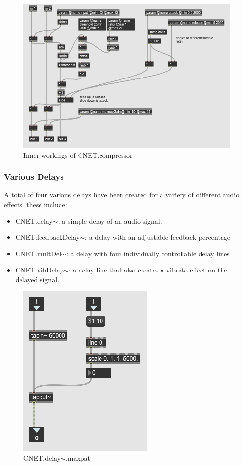 \begin{figure}
    \centering
    \includegraphics{diagrams/maxPatches/compInner.png}
    \caption{Inner workings of CNET.compressor~}
    \label{fig:compressor~Inner}
\end{figure}

\subsubsection{Various Delays}
A total of four various delays have been created for a variety of different audio effects. these include:

\begin{itemize}
    \item CNET.delay$\sim$: a simple delay of an audio signal.
    \item CNET.feedbackDelay$\sim$: a delay with an adjustable feedback percentage
    \item CNET.multDel$\sim$: a delay with four individually controllable delay lines
    \item CNET.vibDelay$\sim$: a delay line that also creates a vibrato effect on the delayed signal.
\end{itemize}

\begin{figure}
    \centering
    \includegraphics{diagrams/maxPatches/CNET.delay~.png}
    \caption{CNET.delay$\sim$.maxpat}
    \label{fig:delMaxpat}
\end{figure}

